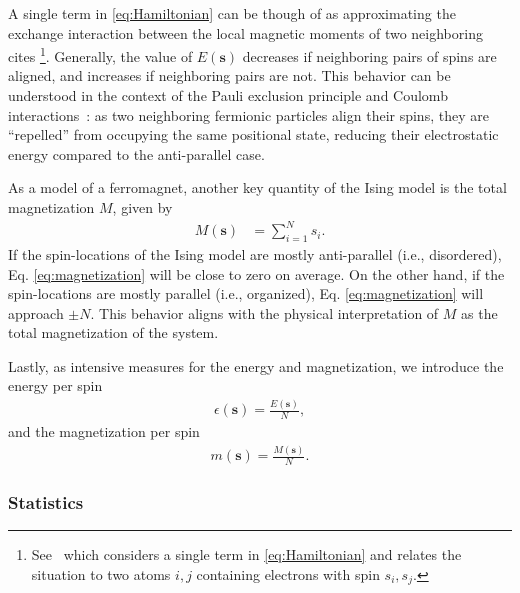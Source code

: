 \documentclass[english,notitlepage,reprint]{revtex4-2}  %
\renewcommand{\vec}[1]{\mathbf{#1}}
\begin{document}
A single term in \eqref{eq:Hamiltonian} can be though of as approximating the exchange interaction between the local magnetic moments of two neighboring cites \footnote{See~\cite[p. 325]{kittel2004introduction} which considers a single term in \eqref{eq:Hamiltonian} and relates the situation to two atoms \(i,j\) containing electrons with spin \(s_i, s_j\).}. 
Generally, the value of \(E(\vec{s})\) decreases if neighboring pairs of spins are aligned, and increases if neighboring pairs are not. 
This behavior can be understood in the context of the Pauli exclusion principle and Coulomb interactions~\cite[p. 325]{kittel2004introduction}: as two neighboring fermionic particles align their spins, they are ``repelled'' from occupying the same positional state, reducing their electrostatic energy compared to the anti-parallel case. 

As a model of a ferromagnet, another key quantity of the Ising model is the total magnetization \(M\), given by
\begin{align}
    M(\vec{s}) & = \sum_{i=1}^N s_i.    \label{eq:magnetization}
\end{align}
If the spin-locations of the Ising model are mostly anti-parallel (i.e., disordered), Eq. \eqref{eq:magnetization} will be close to zero on average.
On the other hand, if the spin-locations are mostly parallel (i.e., organized), Eq. \eqref{eq:magnetization} will approach \(\pm N\). 
This behavior aligns with the physical interpretation of \(M\) as the total magnetization of the system.

Lastly, as intensive measures for the energy and magnetization, we introduce the energy per spin 
\begin{align}
    \epsilon(\vec{s}) = \frac{E(\vec{s})}{N},
\end{align}
and the magnetization per spin
\begin{align}
    m(\vec{s}) = \frac{M({\vec{s}})}{N}.    \label{eq:average_magnetization}
\end{align} 

\subsubsection{Statistics}  \label{sec:statistics}
\end{document}
